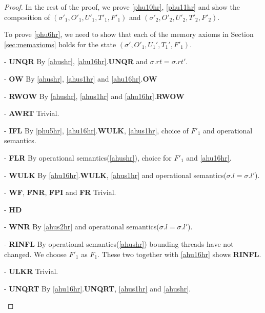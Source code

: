 \begin{proof}
In the rest of the proof, we prove \ref{phu10hr}, \ref{phu11hr} and show the composition of $(\sigma'_1, O'_1, U'_1,T'_1,F'_1)$ and  $(\sigma'_2, O'_2, U'_2,T'_2,F'_2)$. 

To prove \ref{phu6hr}, we need to show that each of the memory axioms in Section \ref{sec:memaxioms} holds for the state $(\sigma',O'_1,U_1',T_1',F'_1)$.
\begin{case} - \textbf{UNQR} By \ref{ahushr}, \ref{ahu16hr}.\textbf{UNQR} and $\sigma.rt = \sigma.rt'$.
\end{case}
\begin{case} - \textbf{OW} By \ref{ahushr}, \ref{ahus1hr} and \ref{ahu16hr}.\textbf{OW}
\end{case}
\begin{case} - \textbf{RWOW} By \ref{ahushr}, \ref{ahus1hr} and \ref{ahu16hr}.\textbf{RWOW}
\end{case}
\begin{case} - \textbf{AWRT} Trivial. 
\end{case}
\begin{case} - \textbf{IFL}  By \ref{phu5hr}, \ref{ahu16hr}.\textbf{WULK}, \ref{ahus1hr}, choice of $F'_1$ and operational semantics.
\end{case}
\begin{case} - \textbf{FLR}  By operational semantics(\ref{ahushr}), choice for $F'_1$ and \ref{ahu16hr}. 
\end{case}
\begin{case} - \textbf{WULK}  By \ref{ahu16hr}.\textbf{WULK}, \ref{ahus1hr} and operational semantics($\sigma.l = \sigma.l'$).
\end{case}
\begin{case} - \textbf{WF}, \textbf{FNR}, \textbf{FPI} and \textbf{FR} Trivial.
\end{case}
\begin{case} - \textbf{HD} 
\end{case}
\begin{case} - \textbf{WNR} By \ref{ahus2hr} and operational semantics($\sigma.l = \sigma.l'$).
\end{case}
\begin{case} - \textbf{RINFL} By operational semantics(\ref{ahushr}) bounding threads have not changed. We choose $F'_1$ as $F_1$. These two together with \ref{ahu16hr} shows \textbf{RINFL}. 
\end{case}
\begin{case} - \textbf{ULKR} Trivial. 
\end{case}
\begin{case} - \textbf{UNQRT}  By \ref{ahu16hr}.\textbf{UNQRT}, \ref{ahus1hr} and \ref{ahushr}.
\end{case}


\end{proof}
